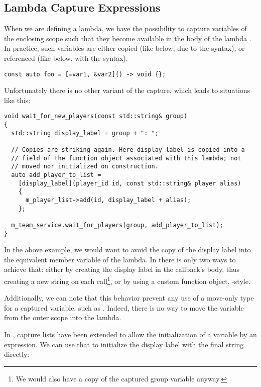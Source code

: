 \subsection{Lambda Capture Expressions}

\problemtitle

When we are defining a lambda, we have the possibility to capture
variables of the enclosing scope such that they become available in
the body of the lambda . In practice, such
variables are either copied (like  below, due to the
\code{=} syntax), or referenced (like  below, with the
\code{\&} syntax).

\begin{lstlisting}
const auto foo = [=var1, &var2]() -> void {};
\end{lstlisting}

Unfortunately there is no other variant of the capture, which leads to
situations like this:

\begin{lstlisting}
void wait_for_new_players(const std::string& group)
{
  std::string display_label = group + ": ";

  // Copies are striking again. Here display_label is copied into a
  // field of the function object associated with this lambda; not
  // moved nor initialized on construction.
  auto add_player_to_list =
    [display_label](player_id id, const std::string& player alias)
    {
      m_player_list->add(id, display_label + alias);
    };

  m_team_service.wait_for_players(group, add_player_to_list);
}
\end{lstlisting}

In the above example, we would want to avoid the copy of the display
label into the equivalent member variable of the lambda. In 
there is only two ways to achieve that: either by creating the display
label in the callback's body, thus creating a new string on each
call\footnote{We would also have a copy of the captured group variable
anyway.}, or by using a custom function object, -style.

Additionally, we can note that this behavior prevent any use of a
move-only type for a captured variable, such as
. Indeed, there is no way to move the variable
from the outer scope into the lambda.

\solutiontitle

In , capture lists have been extended to allow the initialization
of a variable by an expression. We can use that to initialize the
display label with the final string directly:


